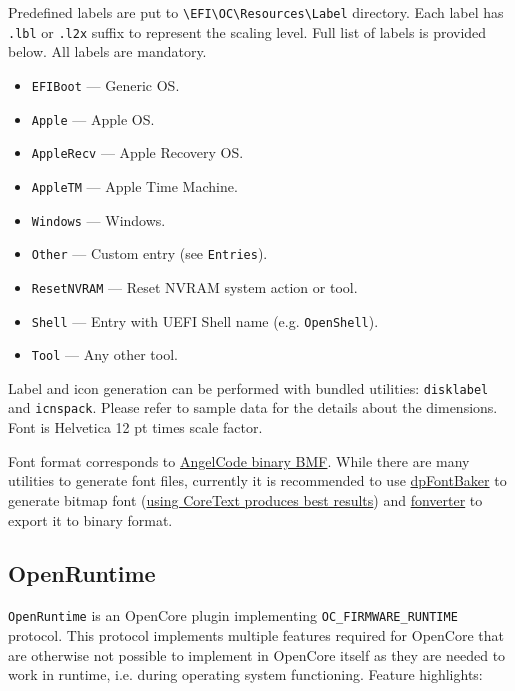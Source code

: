 \documentclass[]{article}
\providecommand{\tightlist}{%
  \setlength{\itemsep}{0pt}\setlength{\parskip}{0pt}}
\begin{document}
Predefined labels are put to \texttt{\textbackslash EFI\textbackslash OC\textbackslash Resources\textbackslash Label}
directory. Each label has \texttt{.lbl} or \texttt{.l2x} suffix to represent the scaling level.
Full list of labels is provided below. All labels are mandatory.

\begin{itemize}
\tightlist
  \item \texttt{EFIBoot} --- Generic OS.
  \item \texttt{Apple} --- Apple OS.
  \item \texttt{AppleRecv} --- Apple Recovery OS.
  \item \texttt{AppleTM} --- Apple Time Machine.
  \item \texttt{Windows} --- Windows.
  \item \texttt{Other} --- Custom entry (see \texttt{Entries}).
  \item \texttt{ResetNVRAM} --- Reset NVRAM system action or tool.
  \item \texttt{Shell} --- Entry with UEFI Shell name (e.g. \texttt{OpenShell}).
  \item \texttt{Tool} --- Any other tool.
\end{itemize}

Label and icon generation can be performed with bundled utilities: \texttt{disklabel} and
\texttt{icnspack}. Please refer to sample data for the details about the dimensions.
Font is Helvetica 12 pt times scale factor.

Font format corresponds to \href{https://www.angelcode.com/products/bmfont}{AngelCode binary BMF}.
While there are many utilities to generate font files, currently it is recommended to use
\href{https://github.com/danpla/dpfontbaker}{dpFontBaker} to generate bitmap font
(\href{https://github.com/danpla/dpfontbaker/pull/1}{using CoreText produces best results})
and \href{https://github.com/usr-sse2/fonverter}{fonverter} to export it to binary format.

\subsection{OpenRuntime}\label{uefiruntime}

\texttt{OpenRuntime} is an OpenCore plugin implementing \texttt{OC\_FIRMWARE\_RUNTIME} protocol.
This protocol implements multiple features required for OpenCore that are otherwise not possible
to implement in OpenCore itself as they are needed to work in runtime, i.e. during operating system
functioning. Feature highlights:
\end{document}
